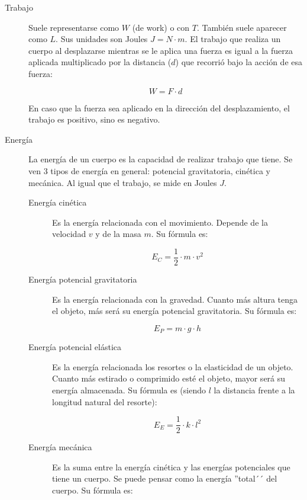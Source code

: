 \begin{description}
    \item[Trabajo]\hfill
    
    Suele representarse como $W$ (de work) o con $T$. También suele aparecer como $L$. Sus unidades son Joules $J=N\cdot m$. El trabajo que realiza un cuerpo al desplazarse mientras se le aplica una fuerza es igual a la fuerza aplicada multiplicado por la distancia ($d$) que recorrió bajo la acción de esa fuerza:
    
    $$W=F\cdot d$$
    
    En caso que la fuerza sea aplicado en la dirección del desplazamiento, el trabajo es positivo, sino es negativo.
    
    \item[Energía]\hfill
    
    La energía de un cuerpo es la capacidad de realizar trabajo que tiene. Se ven 3 tipos de energía en general: potencial gravitatoria, cinética y mecánica. Al igual que el trabajo, se mide en Joules $J$.
    
    \begin{description}
        \item[Energía cinética]\hfill
        
        Es la energía relacionada con el movimiento. Depende de la velocidad $v$ y de la masa $m$. Su fórmula es:
        
        $$E_C=\dfrac{1}{2}\cdot m \cdot v^2$$
        
        \item[Energía potencial gravitatoria]\hfill
        
        Es la energía relacionada con la gravedad. Cuanto más altura tenga el objeto, más será su energía potencial gravitatoria. Su fórmula es:

        $$
        E_P = m\cdot g \cdot h
        $$

        \item[Energía potencial elástica]\hfill
        
        Es la energía relacionada los resortes o la elasticidad de un objeto. Cuanto más estirado o comprimido esté el objeto, mayor será su energía almacenada. Su fórmula es (siendo $l$ la distancia frente a la longitud natural del resorte):
        
        $$E_E =\dfrac{1}{2} \cdot k \cdot l^2$$
        
        \item[Energía mecánica]\hfill
        
        Es la suma entre la energía cinética y las energías potenciales que tiene un cuerpo. Se puede pensar como la energía ''total´´ del cuerpo. Su fórmula es:
        

\end{description}
\end{description}
